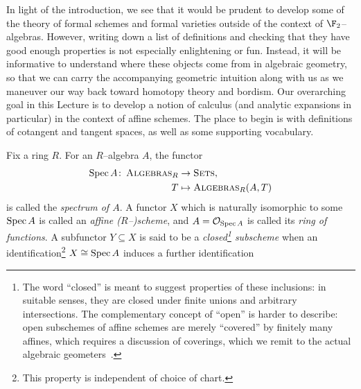 In light of the introduction, we see that it would be prudent to develop some of the theory of formal schemes and formal varieties outside of the context of \(\F_2\)--algebras.  However, writing down a list of definitions and checking that they have good enough properties is not especially enlightening or fun.  Instead, it will be informative to understand where these objects come from in algebraic geometry, so that we can carry the accompanying geometric intuition along with us as we maneuver our way back toward homotopy theory and bordism.  Our overarching goal in this Lecture is to develop a notion of calculus (and analytic expansions in particular) in the context of affine schemes.  The place to begin is with definitions of cotangent and tangent spaces, as well as some supporting vocabulary.
\begin{definition}
Fix a ring \(R\).  For an \(R\)--algebra \(A\), the functor
\begin{align*}
\operatorname{Spec} A \colon\thinspace \normalfont\textsc{Algebras}_R & \to \normalfont\textsc{Sets}, \\
T & \mapsto \normalfont\textsc{Algebras}_R(A, T)
\end{align*}
is called the \textit{spectrum of \(A\)}.  A functor \(X\) which is naturally isomorphic to some \(\operatorname{Spec} A\) is called an \textit{affine (\(R\)--)scheme}, and \(A = \mathcal{O}_{\operatorname{Spec} A}\) is called its \textit{ring of functions}.  A subfunctor \(Y \subseteq X\) is said to be a \textit{closed\footnote{The word ``closed'' is meant to suggest properties of these inclusions: in suitable senses, they are closed under finite unions and arbitrary intersections.  The complementary concept of ``open'' is harder to describe: open subschemes of affine schemes are merely ``covered'' by finitely many affines, which requires a discussion of coverings, which we remit to the actual algebraic geometers~\cite[Definition 8.1]{StricklandFPFP}.} subscheme} when an identification\footnote{This property is independent of choice of chart.} \(X \cong \operatorname{Spec} A\) induces a further identification
\begin{center}
\end{center}
\end{definition}

